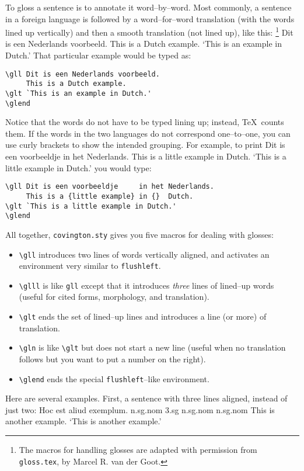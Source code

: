 \documentclass{article}
\begin{document}
To gloss a sentence is to annotate it word--by--word.  Most commonly, a 
sentence in a foreign language is followed by a word--for--word 
translation (with the words lined up vertically) and then a smooth 
translation (not lined up), like this:%
\footnote{The macros for handling glosses are adapted with permission 
from {\tt gloss.tex}, by Marcel R. van der Goot.}
\gll Dit is een Nederlands voorbeeld. 
     This is a Dutch example. 
\glt `This is an example in Dutch.'
\glend
That particular example would be typed as:
\begin{verbatim}
\gll Dit is een Nederlands voorbeeld. 
     This is a Dutch example. 
\glt `This is an example in Dutch.'
\glend
\end{verbatim}
Notice that the words do not have to be typed lining up; instead, \TeX\ 
counts them.  If the words in the two languages do not correspond 
one--to--one, you can use curly brackets to show the intended grouping.
For example, to print
\gll Dit is een voorbeeldje     in het Nederlands.
     This is a {little example} in {}  Dutch.
\glt `This is a little example in Dutch.'
\glend
you would type:
\begin{verbatim}
\gll Dit is een voorbeeldje     in het Nederlands.
     This is a {little example} in {}  Dutch.
\glt `This is a little example in Dutch.'
\glend
\end{verbatim}
All together, {\tt covington.sty} gives you five macros for dealing with
glosses:
\begin{itemize}
\item \verb"\gll" introduces two lines of words vertically aligned, and 
activates an environment very similar to {\tt flushleft}.
\item \verb"\glll" is like \verb"gll" except that it introduces {\em 
three} lines of lined--up words (useful for cited forms, morphology,
and translation).
\item \verb"\glt" ends the set of lined--up lines and introduces a line 
(or more) of translation.
\item \verb"\gln" is like \verb"\glt" but does not start a new line 
(useful when no translation follows but you want to put a number on the 
right).
\item \verb"\glend" ends the special {\tt flushleft}--like environment.
\end{itemize}
Here are several examples.  First, a sentence with three lines aligned, 
instead of just two:
\glll  Hoc est aliud exemplum.
       n.sg.nom 3.sg n.sg.nom n.sg.nom
       This is another example.
\glt   `This is another example.'
\end{document}
